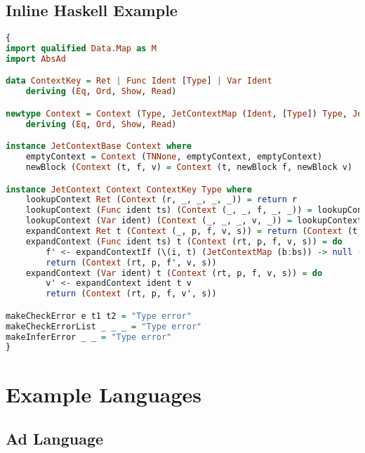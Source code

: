 \section{Inline Haskell Example}
\begin{lstlisting}[caption = Example of initial inline haskell code, label=lst:inlineHaskellCode, language=Haskell]
{
import qualified Data.Map as M
import AbsAd

data ContextKey = Ret | Func Ident [Type] | Var Ident
    deriving (Eq, Ord, Show, Read)

newtype Context = Context (Type, JetContextMap (Ident, [Type]) Type, JetContextMap Ident Type)
    deriving (Eq, Ord, Show, Read)

instance JetContextBase Context where
    emptyContext = Context (TNNone, emptyContext, emptyContext)
    newBlock (Context (t, f, v) = Context (t, newBlock f, newBlock v)

instance JetContext Context ContextKey Type where
    lookupContext Ret (Context (r, _, _, _, _)) = return r
    lookupContext (Func ident ts) (Context (_, _, f, _, _)) = lookupContext (ident, ts) f
    lookupContext (Var ident) (Context (_, _, _, v, _)) = lookupContext ident v
    expandContext Ret t (Context (_, p, f, v, s)) = return (Context (t, p, f, v, s))
    expandContext (Func ident ts) t (Context (rt, p, f, v, s)) = do
        f' <- expandContextIf (\(i, t) (JetContextMap (b:bs)) -> null (filter (\(i', t') -> i == i') (M.keys b))) (ident, ts) t f
        return (Context (rt, p, f', v, s))
    expandContext (Var ident) t (Context (rt, p, f, v, s)) = do
        v' <- expandContext ident t v
        return (Context (rt, p, f, v', s))

makeCheckError e t1 t2 = "Type error"
makeCheckErrorList _ _ _ = "Type error"
makeInferError _ _ = "Type error"
}
\end{lstlisting}

\chapter{Example Languages}
\label{appendix:witnessLanguages}
\section{Ad Language}
